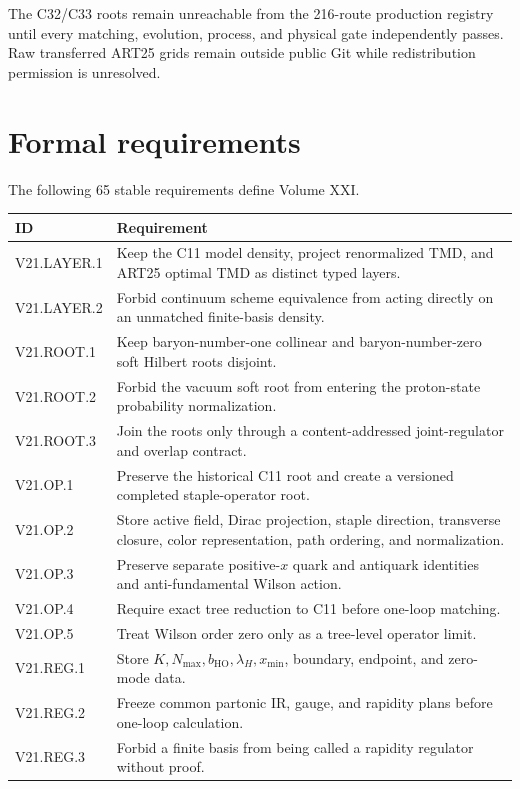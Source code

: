 \documentclass[11pt]{article}
\begin{document}
The C32/C33 roots remain unreachable from the 216-route production registry until every matching, evolution, process, and physical gate independently passes.  Raw transferred ART25 grids remain outside public Git while redistribution permission is unresolved.

\section{Formal requirements}
\label{sec:requirements}

The following 65 stable requirements define Volume XXI.

\begin{longtable}{L{0.19\textwidth}L{0.72\textwidth}}
\toprule
ID & Requirement\\
\midrule
\endhead
V21.LAYER.1 & Keep the C11 model density, project renormalized TMD, and ART25 optimal TMD as distinct typed layers.\\
V21.LAYER.2 & Forbid continuum scheme equivalence from acting directly on an unmatched finite-basis density.\\
V21.ROOT.1 & Keep baryon-number-one collinear and baryon-number-zero soft Hilbert roots disjoint.\\
V21.ROOT.2 & Forbid the vacuum soft root from entering the proton-state probability normalization.\\
V21.ROOT.3 & Join the roots only through a content-addressed joint-regulator and overlap contract.\\
V21.OP.1 & Preserve the historical C11 root and create a versioned completed staple-operator root.\\
V21.OP.2 & Store active field, Dirac projection, staple direction, transverse closure, color representation, path ordering, and normalization.\\
V21.OP.3 & Preserve separate positive-\(x\) quark and antiquark identities and anti-fundamental Wilson action.\\
V21.OP.4 & Require exact tree reduction to C11 before one-loop matching.\\
V21.OP.5 & Treat Wilson order zero only as a tree-level operator limit.\\
V21.REG.1 & Store \(K,N_{\max},b_{\mathrm{HO}},\lambda_H,x_{\min}\), boundary, endpoint, and zero-mode data.\\
V21.REG.2 & Freeze common partonic IR, gauge, and rapidity plans before one-loop calculation.\\
V21.REG.3 & Forbid a finite basis from being called a rapidity regulator without proof.\\

\end{longtable}
\end{document}
